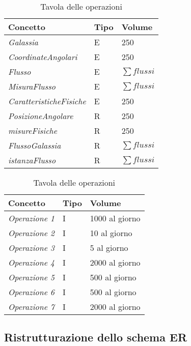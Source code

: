 \documentclass[12pt,a4paper,onecolumn,x11names]{article}
\def \hfillx {\hspace*{-\textwidth} \hfill}
\begin{document}
		\begin{table}[ht]
				\begin{minipage}{0.5\textwidth}
					\centering
					\begin{tabular}{lll}
						\hline
						\rowcolor[HTML]{66CC99}Concetto & Tipo & Volume \\ \hline
						\textit{Galassia}					& E & 250 \\
						\textit{CoordinateAngolari} 		& E & 250 \\
						\textit{Flusso}						& E & $\sum flussi$ \\
						\textit{MisuraFlusso}				& E & $\sum flussi$ \\
						\textit{CaratteristicheFisiche}		& E & 250 \\
						\textit{PosizioneAngolare}			& R & 250 \\
						\textit{misureFisiche}				& R & 250 \\
						\textit{FlussoGalassia}				& R & $\sum flussi$\\
						\textit{istanzaFlusso} 				& R & $\sum flussi$ 
					\end{tabular}
					\caption{Tavola dei volumi}
				\end{minipage}
				\hfillx
				\begin{minipage}{0.5\textwidth}
					\centering
					\begin{tabular}{lll}
						\hline
						\rowcolor[HTML]{66CC99}Concetto & Tipo & Volume \\ \hline
						\textit{Operazione 1} & I & 1000 al giorno 	\\
						\textit{Operazione 2} & I & 10 al giorno	\\
						\textit{Operazione 3} & I & 5 al giorno		\\
						\textit{Operazione 4} & I & 2000 al giorno	\\
						\textit{Operazione 5} & I & 500 al giorno 	\\
						\textit{Operazione 6} & I & 500 al giorno 	\\
						\textit{Operazione 7} & I &	2000 al giorno	
					\end{tabular}
					\caption{Tavola delle operazioni}
				\end{minipage}
		\end{table}
	
	\subsection{Ristrutturazione dello schema ER}
	
\end{document}
